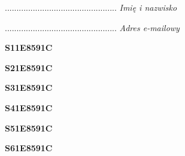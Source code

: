 \begin{turn}{90}\begin{minipage}{\linewidth} \vspace{20mm} ................................................  \textit{Imię i nazwisko}\end{minipage}\end{turn}

\begin{turn}{90}\begin{minipage}{\linewidth} \vspace{20mm} ................................................  \textit{Adres e-mailowy}\end{minipage}\end{turn}

\begin{turn}{90}\huge \begin{minipage}{\linewidth} \vspace{10mm}\textbf{S11E8591C}\end{minipage}\end{turn}

\begin{turn}{90}\huge \begin{minipage}{\linewidth} \vspace{10mm}\textbf{S21E8591C}\end{minipage}\end{turn}

\begin{turn}{90}\huge \begin{minipage}{\linewidth} \vspace{10mm}\textbf{S31E8591C}\end{minipage}\end{turn}

\begin{turn}{90}\huge \begin{minipage}{\linewidth} \vspace{10mm}\textbf{S41E8591C}\end{minipage}\end{turn}

\begin{turn}{90}\huge \begin{minipage}{\linewidth} \vspace{10mm}\textbf{S51E8591C}\end{minipage}\end{turn}

\begin{turn}{90}\huge \begin{minipage}{\linewidth} \vspace{10mm}\textbf{S61E8591C}\end{minipage}\end{turn}

